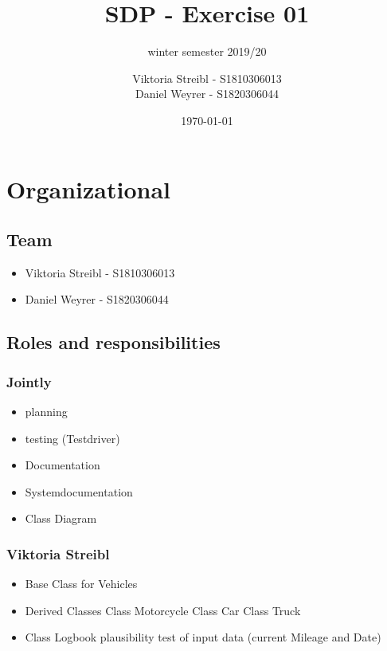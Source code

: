

\graphicspath{{./}}



\title{SDP - Exercise 01} %
\subtitle{winter semester 2019/20} %
\author{
Viktoria Streibl - S1810306013\\
  Daniel Weyrer - S1820306044
} %
\date{\today} %

\maketitle %

\newpage
\tableofcontents %
\newpage

\section{Organizational}
\subsection{Team}
\begin{itemize}
	\item Viktoria 	Streibl 		- 	S1810306013
	\item Daniel 	Weyrer		-	S1820306044
\end{itemize}

\subsection{Roles and responsibilities}

\subsubsection{Jointly}
\begin{itemize}
	\item planning
	\item testing (Testdriver)
	\item Documentation
	\item Systemdocumentation
	\item Class Diagram
\end{itemize}

\subsubsection{Viktoria Streibl}
\begin{itemize}
	\item Base Class for Vehicles
	\item Derived Classes
		\subitem Class Motorcycle
		\subitem Class Car
		\subitem Class Truck
	\item Class Logbook
		\subitem plausibility test of input data (current Mileage and Date)
\end{itemize}

